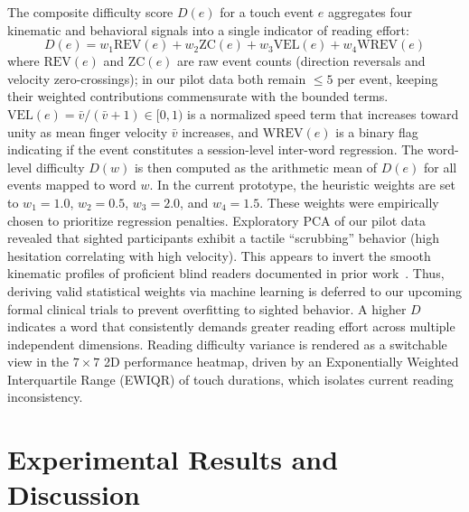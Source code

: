\documentclass[conference]{IEEEtran}
\begin{document}
    The composite difficulty score $D(e)$ for a touch event $e$ aggregates four kinematic and behavioral signals into a single indicator of reading effort:
    \begin{equation}
        D(e) = w_1\mathrm{REV}(e) + w_2\mathrm{ZC}(e) + w_3\mathrm{VEL}(e) + w_4\mathrm{WREV}(e)
        \label{eq:difficulty}
    \end{equation}
    where $\mathrm{REV}(e)$ and $\mathrm{ZC}(e)$ are raw event counts (direction reversals and velocity zero-crossings); in our pilot data both remain $\leq 5$ per event, keeping their weighted contributions commensurate with the bounded terms. $\mathrm{VEL}(e) = \bar{v}/(\bar{v}+1)\in[0,1)$
is a normalized speed term that increases toward unity as mean finger velocity
$\bar{v}$ increases, and $\mathrm{WREV}(e)$ is a binary flag indicating if the event constitutes a session-level inter-word regression. The word-level difficulty $D(w)$ is then computed as the arithmetic mean of $D(e)$ for all events mapped to word $w$. In the current prototype, the heuristic weights are set to $w_1=1.0$, $w_2=0.5$, $w_3=2.0$, and $w_4=1.5$. These weights were empirically chosen to prioritize regression penalties. Exploratory PCA of our pilot data revealed that sighted participants exhibit a tactile ``scrubbing'' behavior (high hesitation correlating with high velocity). This appears to invert the smooth kinematic profiles of proficient blind readers documented in prior work~\cite{nonaka2021}. Thus, deriving valid statistical weights via machine learning is deferred to our upcoming formal clinical trials to prevent overfitting to sighted behavior.
    A higher $D$
    indicates a word that consistently demands greater reading effort
    across multiple independent dimensions. Reading difficulty variance is rendered as a switchable view in the $7\times7$ 2D performance heatmap, driven by an Exponentially Weighted Interquartile Range (EWIQR) of touch durations, which isolates current reading inconsistency.


    \section{Experimental Results and Discussion}
    \label{sec:results}
\end{document}
